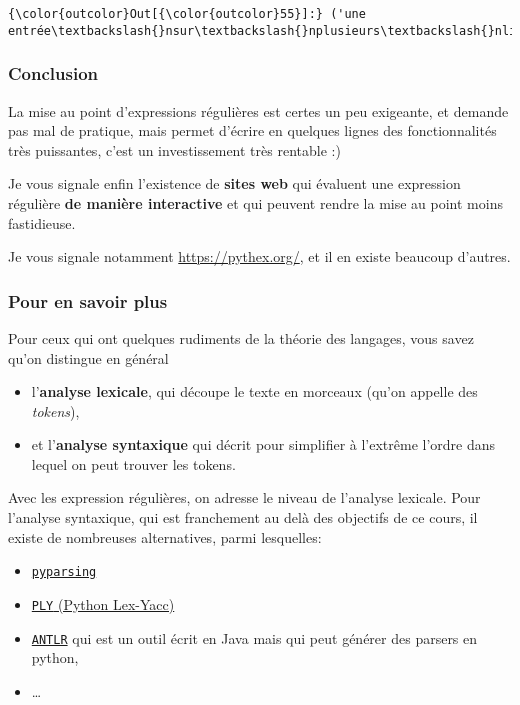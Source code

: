 \begin{Verbatim}[commandchars=\\\{\},frame=single,framerule=0.3mm,rulecolor=\color{cellframecolor}]
{\color{outcolor}Out[{\color{outcolor}55}]:} ('une entrée\textbackslash{}nsur\textbackslash{}nplusieurs\textbackslash{}nlignes\textbackslash{}n',)
\end{Verbatim}
            
    \hypertarget{conclusion}{%
\subsubsection{Conclusion}\label{conclusion}}

    La mise au point d'expressions régulières est certes un peu exigeante,
et demande pas mal de pratique, mais permet d'écrire en quelques lignes
des fonctionnalités très puissantes, c'est un investissement très
rentable :)

    Je vous signale enfin l'existence de \textbf{sites web} qui évaluent une
expression régulière \textbf{de manière interactive} et qui peuvent
rendre la mise au point moins fastidieuse.

Je vous signale notamment \url{https://pythex.org/}, et il en existe
beaucoup d'autres.

    \hypertarget{pour-en-savoir-plus}{%
\subsubsection{Pour en savoir plus}\label{pour-en-savoir-plus}}

    Pour ceux qui ont quelques rudiments de la théorie des langages, vous
savez qu'on distingue en général

\begin{itemize}
\tightlist
\item
  l'\textbf{analyse lexicale}, qui découpe le texte en morceaux (qu'on
  appelle des \emph{tokens}),
\item
  et l'\textbf{analyse syntaxique} qui décrit pour simplifier à
  l'extrême l'ordre dans lequel on peut trouver les tokens.
\end{itemize}

Avec les expression régulières, on adresse le niveau de l'analyse
lexicale. Pour l'analyse syntaxique, qui est franchement au delà des
objectifs de ce cours, il existe de nombreuses alternatives, parmi
lesquelles:

\begin{itemize}
\tightlist
\item
  \href{http://pyparsing.wikispaces.com/Download+and+Installation}{\texttt{pyparsing}}
\item
  \href{http://www.dabeaz.com/ply/}{\texttt{PLY} (Python Lex-Yacc)}
\item
  \href{http://www.antlr.org}{\texttt{ANTLR}} qui est un outil écrit en
  Java mais qui peut générer des parsers en python,
\item
  \ldots{}
\end{itemize}


    
    
    

